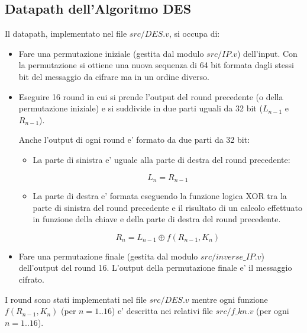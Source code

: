 \documentclass[a4paper]{article}
\begin{document}
\subsection{Datapath dell'Algoritmo DES}
Il datapath, implementato nel file $src/DES.v$, si occupa di:
\begin{itemize}
    \item Fare una permutazione iniziale (gestita dal modulo $src/IP.v$) dell'input. Con la permutazione si ottiene una nuova sequenza di 64 bit formata dagli stessi bit del messaggio da cifrare ma in un ordine diverso.
    \item Eseguire 16 round in cui si prende l'output del round precedente (o della permutazione iniziale) e si suddivide in due parti uguali da 32 bit ($L_{n-1}$ e $R_{n-1}$).


          Anche l'output di ogni round e' formato da due parti da 32 bit:
          \begin{itemize}
              \item La parte di sinistra e' uguale alla parte di destra del round precedente: 
                
                    $$L_n = R_{n-1}$$

              \item La parte di destra e' formata eseguendo la funzione logica XOR tra la parte di sinistra del round precedente e il risultato di un calcolo effettuato in funzione della chiave e della parte di destra del round precedente.

                    $$R_n = L_{n-1} \oplus f(R_{n-1}, K_n)$$

          \end{itemize}  
    \item Fare una permutazione finale (gestita dal modulo $src/inverse\_IP.v$) dell'output del round 16. L'output della permutazione finale e' il messaggio cifrato.
\end{itemize}



I round sono stati implementati nel file $src/DES.v$ mentre ogni funzione $f(R_{n-1}, K_n)$ (per $n = 1 .. 16$) e' descritta nei relativi file $src/f\_kn.v$ (per ogni $n = 1 .. 16$).

\end{document}
